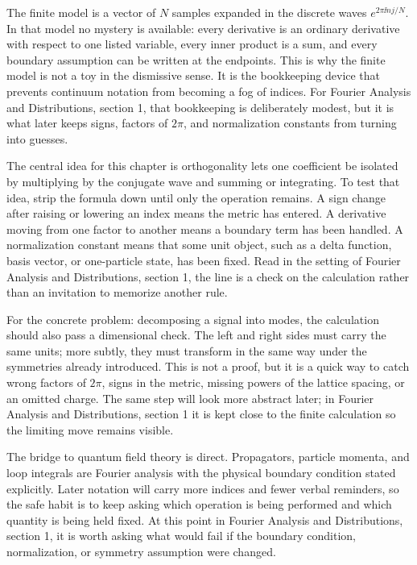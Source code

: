 The finite model is a vector of \(N\) samples expanded in the discrete waves \(e^{2\pi \ii nj/N}\).  In that model no mystery is available: every derivative is an ordinary derivative with respect to one listed variable, every inner product is a sum, and every boundary assumption can be written at the endpoints.  This is why the finite model is not a toy in the dismissive sense.  It is the bookkeeping device that prevents continuum notation from becoming a fog of indices.  For Fourier Analysis and Distributions, section 1, that bookkeeping is deliberately modest, but it is what later keeps signs, factors of \(2\pi\), and normalization constants from turning into guesses.

The central idea for this chapter is orthogonality lets one coefficient be isolated by multiplying by the conjugate wave and summing or integrating.  To test that idea, strip the formula down until only the operation remains.  A sign change after raising or lowering an index means the metric has entered.  A derivative moving from one factor to another means a boundary term has been handled.  A normalization constant means that some unit object, such as a delta function, basis vector, or one-particle state, has been fixed.  Read in the setting of Fourier Analysis and Distributions, section 1, the line is a check on the calculation rather than an invitation to memorize another rule.

For the concrete problem: decomposing a signal into modes, the calculation should also pass a dimensional check.  The left and right sides must carry the same units; more subtly, they must transform in the same way under the symmetries already introduced.  This is not a proof, but it is a quick way to catch wrong factors of \(2\pi\), signs in the metric, missing powers of the lattice spacing, or an omitted charge.  The same step will look more abstract later; in Fourier Analysis and Distributions, section 1 it is kept close to the finite calculation so the limiting move remains visible.

The bridge to quantum field theory is direct.  Propagators, particle momenta, and loop integrals are Fourier analysis with the physical boundary condition stated explicitly.  Later notation will carry more indices and fewer verbal reminders, so the safe habit is to keep asking which operation is being performed and which quantity is being held fixed.  At this point in Fourier Analysis and Distributions, section 1, it is worth asking what would fail if the boundary condition, normalization, or symmetry assumption were changed.

